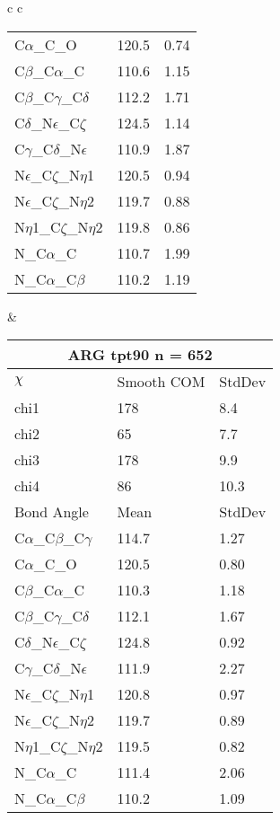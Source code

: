 \begin{longtable}{ c c }
\begin{tabular}{ l l l }
  C$\alpha$\_C\_O & 120.5 & 0.74\\
  C$\beta$\_C$\alpha$\_C & 110.6 & 1.15\\
  C$\beta$\_C$\gamma$\_C$\delta$ & 112.2 & 1.71\\
  C$\delta$\_N$\epsilon$\_C$\zeta$ & 124.5 & 1.14\\
  C$\gamma$\_C$\delta$\_N$\epsilon$ & 110.9 & 1.87\\
  N$\epsilon$\_C$\zeta$\_N$\eta$1 & 120.5 & 0.94\\
  N$\epsilon$\_C$\zeta$\_N$\eta$2 & 119.7 & 0.88\\
  N$\eta$1\_C$\zeta$\_N$\eta$2 & 119.8 & 0.86\\
  N\_C$\alpha$\_C & 110.7 & 1.99\\
  N\_C$\alpha$\_C$\beta$ & 110.2 & 1.19\\
  \bottomrule
  \end{tabular}
  &
  \begin{tabular}{ l l l }
  \toprule
  \multicolumn{3}{c}{ARG \textbf{tpt90} n = 652} \\ \toprule
  $\chi$       & Smooth COM & StdDev \\ \midrule
  chi1 & 178 & 8.4 \\ 
  chi2 & 65 & 7.7 \\ 
  chi3 & 178 & 9.9 \\ 
  chi4 & 86 & 10.3 \\ \midrule
  Bond Angle   & Mean     & StdDev \\ \midrule
  C$\alpha$\_C$\beta$\_C$\gamma$ & 114.7 & 1.27\\
  C$\alpha$\_C\_O & 120.5 & 0.80\\
  C$\beta$\_C$\alpha$\_C & 110.3 & 1.18\\
  C$\beta$\_C$\gamma$\_C$\delta$ & 112.1 & 1.67\\
  C$\delta$\_N$\epsilon$\_C$\zeta$ & 124.8 & 0.92\\
  C$\gamma$\_C$\delta$\_N$\epsilon$ & 111.9 & 2.27\\
  N$\epsilon$\_C$\zeta$\_N$\eta$1 & 120.8 & 0.97\\
  N$\epsilon$\_C$\zeta$\_N$\eta$2 & 119.7 & 0.89\\
  N$\eta$1\_C$\zeta$\_N$\eta$2 & 119.5 & 0.82\\
  N\_C$\alpha$\_C & 111.4 & 2.06\\
  N\_C$\alpha$\_C$\beta$ & 110.2 & 1.09\\
  \bottomrule
  \end{tabular}
  \\

\end{longtable}
